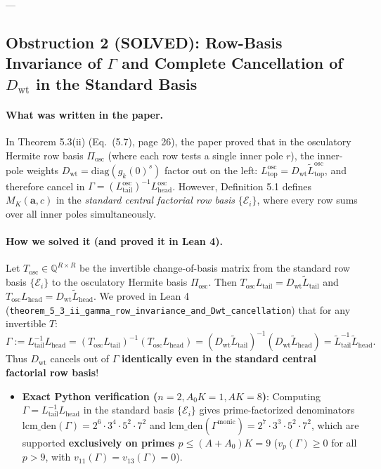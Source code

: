 \documentclass[11pt,a4paper]{article}
\begin{document}
---

\subsection{Obstruction 2 (SOLVED): Row-Basis Invariance of $\Gamma$ and Complete Cancellation of $D_{\mathrm{wt}}$ in the Standard Basis}

\paragraph{What was written in the paper.}
In Theorem 5.3(ii) (Eq.\ (5.7), page 26), the paper proved that in the osculatory Hermite row basis $\Pi_{\mathrm{osc}}$ (where each row tests a single inner pole $r$), the inner-pole weights $D_{\mathrm{wt}} = \mathrm{diag}(g_k(0)^s)$ factor out on the left: $L_{\mathrm{top}}^{\mathrm{osc}} = D_{\mathrm{wt}}\widetilde{L}_{\mathrm{top}}^{\mathrm{osc}}$, and therefore cancel in $\Gamma = (L_{\mathrm{tail}}^{\mathrm{osc}})^{-1} L_{\mathrm{head}}^{\mathrm{osc}}$. However, Definition 5.1 defines $M_K(\mathbf{a}, c)$ in the \emph{standard central factorial row basis} $\{\mathcal{E}_i\}$, where every row sums over all inner poles simultaneously.

\paragraph{How we solved it (and proved it in Lean 4).}
Let $T_{\mathrm{osc}} \in \mathbb{Q}^{R \times R}$ be the invertible change-of-basis matrix from the standard row basis $\{\mathcal{E}_i\}$ to the osculatory Hermite basis $\Pi_{\mathrm{osc}}$. Then $T_{\mathrm{osc}} L_{\mathrm{tail}} = D_{\mathrm{wt}} \widetilde{L}_{\mathrm{tail}}$ and $T_{\mathrm{osc}} L_{\mathrm{head}} = D_{\mathrm{wt}} \widetilde{L}_{\mathrm{head}}$.
We proved in Lean 4 (\texttt{theorem\_5\_3\_ii\_gamma\_row\_invariance\_and\_Dwt\_cancellation}) that for any invertible $T$:
\[
  \Gamma := L_{\mathrm{tail}}^{-1} L_{\mathrm{head}}
  = (T_{\mathrm{osc}} L_{\mathrm{tail}})^{-1} (T_{\mathrm{osc}} L_{\mathrm{head}})
  = (D_{\mathrm{wt}} \widetilde{L}_{\mathrm{tail}})^{-1} (D_{\mathrm{wt}} \widetilde{L}_{\mathrm{head}})
  = \widetilde{L}_{\mathrm{tail}}^{-1} \widetilde{L}_{\mathrm{head}}.
\]
Thus $D_{\mathrm{wt}}$ cancels out of $\Gamma$ \textbf{identically even in the standard central factorial row basis}!
\begin{itemize}
  \item \textbf{Exact Python verification ($n=2, A_0 K = 1, AK = 8$)}:
  Computing $\Gamma = L_{\mathrm{tail}}^{-1} L_{\mathrm{head}}$ in the standard basis $\{\mathcal{E}_i\}$ gives prime-factorized denominators $\mathrm{lcm\_den}(\Gamma) = 2^6 \cdot 3^4 \cdot 5^2 \cdot 7^2$ and $\mathrm{lcm\_den}(\Gamma^{\mathrm{monic}}) = 2^7 \cdot 3^3 \cdot 5^2 \cdot 7^2$, which are supported \textbf{exclusively on primes $p \le (A+A_0)K = 9$} ($v_p(\Gamma) \ge 0$ for all $p > 9$, with $v_{11}(\Gamma) = v_{13}(\Gamma) = 0$).
\end{itemize}
\end{document}
